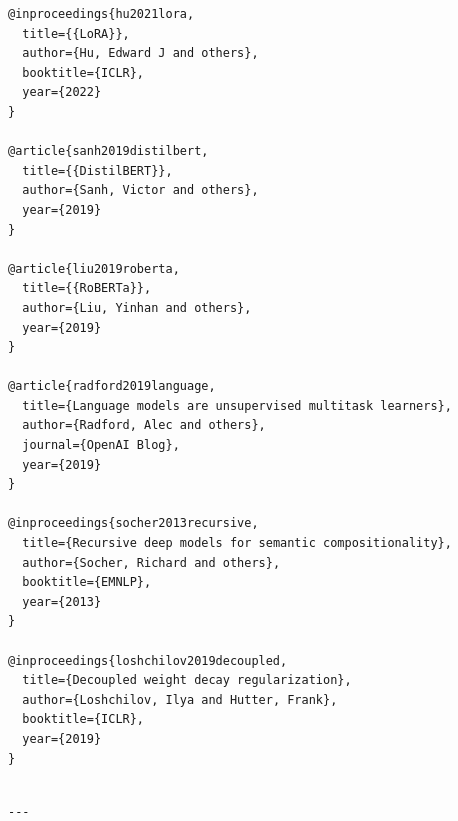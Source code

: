 \begin{lstlisting}
@inproceedings{hu2021lora,
  title={{LoRA}},
  author={Hu, Edward J and others},
  booktitle={ICLR},
  year={2022}
}

@article{sanh2019distilbert,
  title={{DistilBERT}},
  author={Sanh, Victor and others},
  year={2019}
}

@article{liu2019roberta,
  title={{RoBERTa}},
  author={Liu, Yinhan and others},
  year={2019}
}

@article{radford2019language,
  title={Language models are unsupervised multitask learners},
  author={Radford, Alec and others},
  journal={OpenAI Blog},
  year={2019}
}

@inproceedings{socher2013recursive,
  title={Recursive deep models for semantic compositionality},
  author={Socher, Richard and others},
  booktitle={EMNLP},
  year={2013}
}

@inproceedings{loshchilov2019decoupled,
  title={Decoupled weight decay regularization},
  author={Loshchilov, Ilya and Hutter, Frank},
  booktitle={ICLR},
  year={2019}
}
\end{lstlisting}
\begin{lstlisting}

---
\end{lstlisting}
